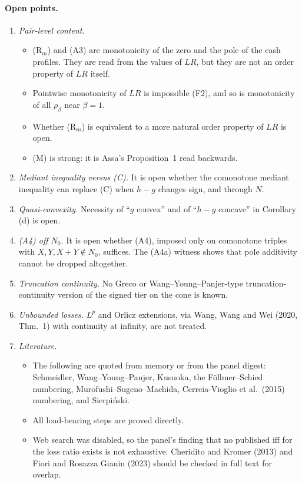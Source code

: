 \paragraph{Open points.}
\begin{enumerate}
\item \emph{Pair-level content.}
  \begin{itemize}
  \item (R$_m$) and (A3) are monotonicity of the zero and the pole of the cash profiles. They are read from the values of $LR$, but they are not an order property of $LR$ itself.
  \item Pointwise monotonicity of $LR$ is impossible (F2), and so is monotonicity of all $\rho_\beta$ near $\beta=1$.
  \item Whether (R$_m$) is equivalent to a more natural order property of $LR$ is open.
  \item (M) is strong: it is Assa's Proposition~1 read backwards.
  \end{itemize}
\item \emph{Mediant inequality versus (C).} It is open whether the comonotone mediant inequality can replace (C) when $h-g$ changes sign, and through $N$.
\item \emph{Quasi-convexity.} Necessity of ``$g$ convex'' and of ``$h-g$ concave'' in Corollary (d) is open.
\item \emph{(A4) off $N_0$.} It is open whether (A4), imposed only on comonotone triples with $X,Y,X+Y\notin N_0$, suffices. The (A4a) witness shows that pole additivity cannot be dropped altogether.
\item \emph{Truncation continuity.} No Greco or Wang--Young--Panjer-type truncation-continuity version of the signed tier on the cone is known.
\item \emph{Unbounded losses.} $L^p$ and Orlicz extensions, via Wang, Wang and Wei (2020, Thm.~1) with continuity at infinity, are not treated.
\item \emph{Literature.}
  \begin{itemize}
  \item The following are quoted from memory or from the panel digest: Schmeidler, Wang--Young--Panjer, Kusuoka, the F\"ollmer--Schied numbering, Murofushi--Sugeno--Machida, Cerreia-Vioglio et al.\ (2015) numbering, and Sierpi\'nski.
  \item All load-bearing steps are proved directly.
  \item Web search was disabled, so the panel's finding that no published iff for the loss ratio exists is not exhaustive. Cheridito and Kromer (2013) and Fiori and Rosazza Gianin (2023) should be checked in full text for overlap.

\end{itemize}
\end{enumerate}
